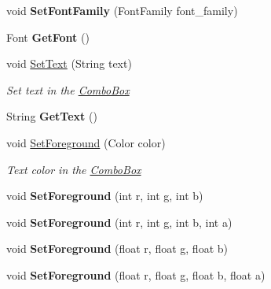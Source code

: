 \begin{DoxyCompactItemize}
\mbox{\label{class_space_v_i_l_1_1_combo_box_a01f181a536fffe738b34aadaa137a643}} 
void {\bfseries Set\+Font\+Family} (Font\+Family font\+\_\+family)
\item 
\mbox{\label{class_space_v_i_l_1_1_combo_box_a8b5044048a32fb1ed44e86e8a8629121}} 
Font {\bfseries Get\+Font} ()
\item 
void \mbox{\hyperlink{class_space_v_i_l_1_1_combo_box_a9a72026c1c366df889b2f8829e965b98}{Set\+Text}} (String text)
\begin{DoxyCompactList}\small\item\em Set text in the \mbox{\hyperlink{class_space_v_i_l_1_1_combo_box}{Combo\+Box}} \end{DoxyCompactList}\item 
\mbox{\label{class_space_v_i_l_1_1_combo_box_abf4fa44bae22b3e3ab804639faf55238}} 
String {\bfseries Get\+Text} ()
\item 
void \mbox{\hyperlink{class_space_v_i_l_1_1_combo_box_a968e19273a68fd5655ddead9149ad72c}{Set\+Foreground}} (Color color)
\begin{DoxyCompactList}\small\item\em Text color in the \mbox{\hyperlink{class_space_v_i_l_1_1_combo_box}{Combo\+Box}} \end{DoxyCompactList}\item 
\mbox{\label{class_space_v_i_l_1_1_combo_box_adeebc47cbbe63c134bfd54fbc903ceb2}} 
void {\bfseries Set\+Foreground} (int r, int g, int b)
\item 
\mbox{\label{class_space_v_i_l_1_1_combo_box_a72a43e864c3e81d11b800a974fec0b6c}} 
void {\bfseries Set\+Foreground} (int r, int g, int b, int a)
\item 
\mbox{\label{class_space_v_i_l_1_1_combo_box_a7ed276a6c360cf4c591431d36c2a7542}} 
void {\bfseries Set\+Foreground} (float r, float g, float b)
\item 
\mbox{\label{class_space_v_i_l_1_1_combo_box_aad44c849af0f9bb7c4861e800660d355}} 
void {\bfseries Set\+Foreground} (float r, float g, float b, float a)

\end{DoxyCompactItemize}
